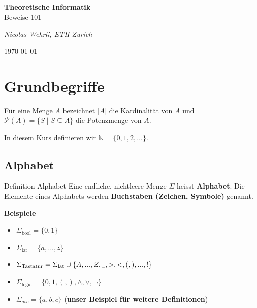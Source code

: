 \documentclass[a4paper, 11pt]{article}
\def\N{\mathbb{N}}
\newcommand\myTitle[1]{{\large \textbf {#1}}}
\begin{document}
   \begin{titlepage}
    \begin{center}
        \vspace*{5cm}
        \LARGE \textbf{Theoretische Informatik} \\ Beweise 101
    
        \small\textit{Nicolas Wehrli, ETH Zurich}

        \vspace*{5cm}
        \today
    \end{center}
   
   \end{titlepage}
   \tableofcontents
    \newpage



    \section{Grundbegriffe} %


	Für eine Menge $A$ bezeichnet $|A|$ die Kardinalität von $A$ und $\mathcal{P}(A) = \{S \mid S \subseteq A\}$ die Potenzmenge von $A$.
		
	 In diesem Kurs definieren wir $\N = \{0,1,2, \dots\}$.


\subsection{Alphabet}


		
	 \begin{mainbox}{Definition Alphabet}
		Eine endliche, nichtleere Menge $\Sigma$ heisst \textbf{Alphabet}. Die Elemente eines Alphabets werden \textbf{Buchstaben (Zeichen, Symbole)} genannt.
	 \end{mainbox}
	 
	 \myTitle{Beispiele}
	 \begin{itemize}
		\item $\Sigma_{\text{bool}} = \{0,1\}$
		\item $\Sigma_{\text{lat}} = \{a, ..., z\}$
		\item $\Sigma_{\text{Tastatur}} = \Sigma_{\text{lat}} \cup \{A, ..., Z, \text{\textvisiblespace}, >, <, (,),...,! \}$
		\item $\Sigma_{\text{logic}} = \{0,1,(,),\land, \lor, \lnot\}$
		\item $\Sigma_{abc} = \{a,b,c\}$ (\textbf{unser Beispiel für weitere Definitionen})
	 \end{itemize}
\end{document}
